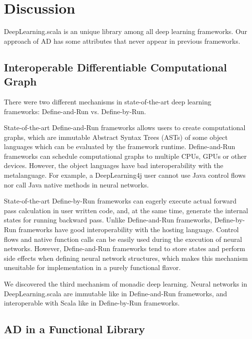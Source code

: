 \section{Discussion}

DeepLearning.scala is an unique library among all deep learning frameworks. Our approach of AD has some attributes that never appear in previous frameworks.

\subsection{Interoperable Differentiable Computational Graph}

There were two different mechanisms in state-of-the-art deep learning frameworks:
Define-and-Run vs. Define-by-Run.

State-of-the-art Define-and-Run frameworks \cite{collobert2008torch,bergstra2010theano,jia2014caffe,chen2015mxnet,abadi2016tensorflow,intel2016bigdl,skymind2017deeplearning4j} allows users to create \glspl{computational graph}, which are immutable Abstract Syntax Trees (ASTs) of some object languages which can be evaluated by the framework runtime. Define-and-Run frameworks can schedule \glspl{computational graph} to multiple CPUs, GPUs or other devices. However, the object languages have bad interoperability with the metalanguage. For example, a DeepLearning4j user cannot use Java control flows nor call Java native methods in neural networks.

State-of-the-art Define-by-Run frameworks \cite{tokui2015chainer,neubig2017dynet,google2017eager,paszke2017pytorch} can eagerly execute actual forward pass calculation in user written code, and, at the same time, generate the internal states for running backward pass. Unlike Define-and-Run frameworks, Define-by-Run frameworks have good interoperability with the hosting language. Control flows and native function calls can be easily used during the execution of neural networks. However, Define-and-Run frameworks tend to store states and perform side effects when defining neural network structures, which makes this mechanism unsuitable for implementation in a purely functional flavor.

We discovered the third mechanism of monadic deep learning. Neural networks in DeepLearning.scala are immutable like in Define-and-Run frameworks, and interoperable with Scala like in Define-by-Run frameworks.

\subsection{AD in a Functional Library}

